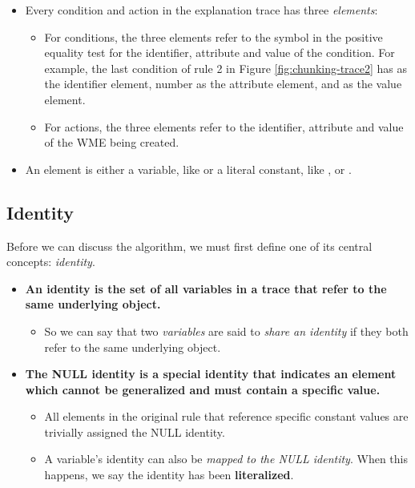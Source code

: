 \begin{itemize}
	\item Every condition and action in the explanation trace has three \textit{elements}:

	\begin{itemize}
		\item For conditions, the three elements refer to the symbol in the positive equality test for the identifier, attribute and value of the condition.  For example, the last condition of rule 2 in Figure \ref{fig:chunking-trace2} has  as the identifier element, number as the attribute element, and  as the value element.

		\item For actions, the three elements refer to the identifier, attribute and value of the WME being created.
	\end{itemize}

	\item An element is either a variable, like    or a literal constant, like  ,    or   .

\end{itemize}

\subsection{Identity}

Before we can discuss the algorithm, we must first define one of its central concepts: \textit{identity}.

\begin{itemize}
	\item \textbf{An identity is the set of all variables in a trace that refer to the same underlying object.}
	\begin{itemize}
		\item So we can say that two \textit{variables} are said to \textit{share an identity} if they both refer to the same underlying object.
	\end{itemize}
	\item \textbf{The NULL identity is a special identity that indicates an element which cannot be generalized and must contain a specific value.}
	\begin{itemize}
		\item All elements in the original rule that reference specific constant values are trivially assigned the NULL identity.
		\item A variable's identity can also be \textit{mapped to the NULL identity}.  When this happens, we say the identity has been \textbf{literalized}.
	\end{itemize}
\end{itemize}

